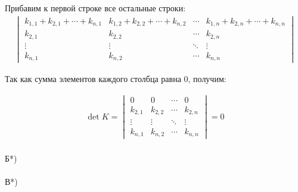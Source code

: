 		Прибавим к первой строке все остальные строки:
		\begin{gather*}
			\begin{vmatrix}
				k_{1, 1} + k_{2, 1} + \cdots + k_{n, 1} & k_{1, 2} + k_{2, 2} + \cdots + k_{n, 2} & \cdots & k_{1, n} + k_{2, n} + \cdots + k_{n, n} \\
				k_{2, 1} & k_{2, 2} & \cdots & k_{2, n} \\        
				\vdots & \vdots & \ddots & \vdots \\
				k_{n, 1} & k_{n, 2} & \cdots & k_{n, n}
			\end{vmatrix}
		\end{gather*}
		
		Так как сумма элементов каждого столбца равна $0$, получим:
		
		\begin{gather*}
			\det K = 
			\begin{vmatrix}
				0 & 0 & \cdots & 0 \\
				k_{2, 1} & k_{2, 2} & \cdots & k_{2, n} \\        
				\vdots & \vdots & \ddots & \vdots \\
				k_{n, 1} & k_{n, 2} & \cdots & k_{n, n}
			\end{vmatrix} = 0
		\end{gather*}
		\\
		Б*)\\
		\\
		В*)\\
			
